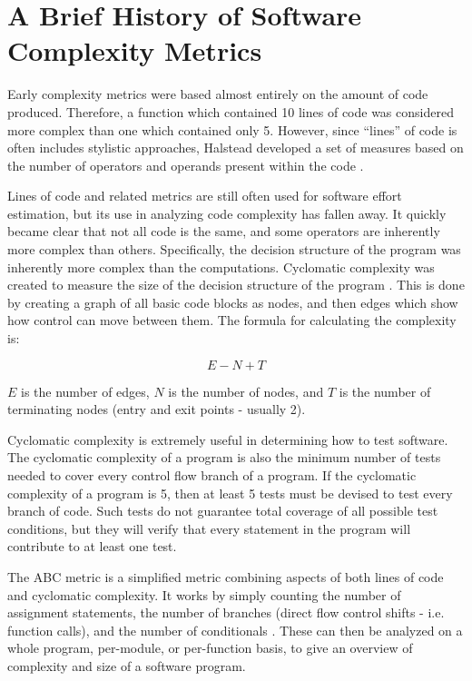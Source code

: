 \section{A Brief History of Software Complexity Metrics}

Early complexity metrics were based almost entirely on the amount of code produced.  Therefore, a function which contained 10 lines of code was considered more complex than one which contained only 5.  However, since ``lines'' of code is often includes stylistic approaches, Halstead developed a set of measures based on the number of operators and operands present within the code \citep{kearney}.

Lines of code and related metrics are still often used for software effort estimation, but its use in analyzing code complexity has fallen away.  It quickly became clear that not all code is the same, and some operators are inherently more complex than others.  Specifically, the decision structure of the program was inherently more complex than the computations.  Cyclomatic complexity was created to measure the size of the decision structure of the program \citep{mccabe}.  This is done by creating a graph of all basic code blocks as nodes, and then edges which show how control can move between them.  The formula for calculating the complexity is:

$$E - N + T$$

$E$ is the number of edges, $N$ is the number of nodes, and $T$ is the number of terminating nodes (entry and exit points - usually 2).   

Cyclomatic complexity is extremely useful in determining how to test software.  The cyclomatic complexity of a program is also the minimum number of tests needed to cover every control flow branch of a program.  If the cyclomatic complexity of a program is 5, then at least 5 tests must be devised to test every branch of code.  Such tests do not guarantee total coverage of all possible test conditions, but they will verify that every statement in the program will contribute to at least one test.

The ABC metric is a simplified metric combining aspects of both lines of code and cyclomatic complexity.  It works by simply counting the number of assignment statements, the number of branches (direct flow control shifts - i.e. function calls), and the number of conditionals \citep[pg.~2--3]{fitzpatrick}.  These can then be analyzed on a whole program, per-module, or per-function basis, to give an overview of complexity and size of a software program.

